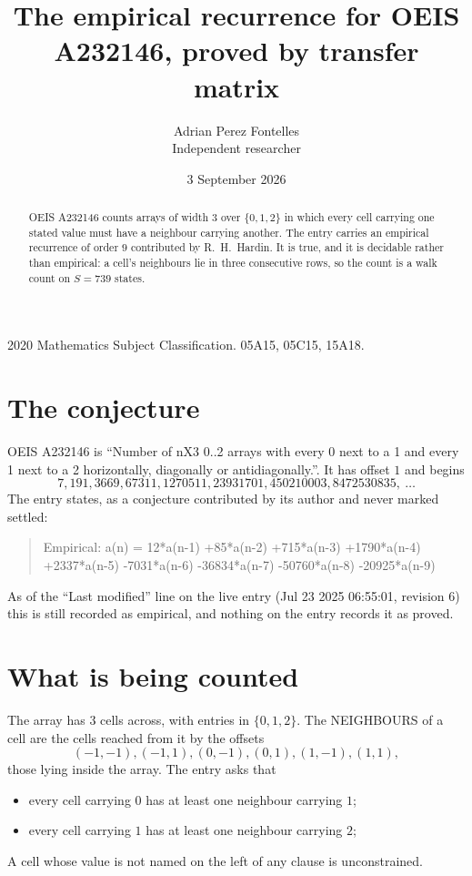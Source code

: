 \documentclass[11pt,a4paper]{article}
\title{The empirical recurrence for OEIS A232146, proved by transfer matrix}
\author{Adrian Perez Fontelles\\ \small Independent researcher}
\date{3 September 2026}
\theoremstyle{plain}
\theoremstyle{definition}
\begin{document}
\maketitle

\begin{abstract}
OEIS A232146 counts arrays of width $3$ over $\{0,1,2\}$ in which every cell carrying one stated
value must have a neighbour carrying another. The entry carries an empirical recurrence of
order $9$ contributed by R.~H.~Hardin. It is true, and it is decidable rather than
empirical: a cell's neighbours lie in three consecutive rows, so the count is a walk count on
$S=739$ states.
\end{abstract}

\noindent\small 2020 Mathematics Subject Classification. 05A15, 05C15, 15A18.\normalsize

\section{The conjecture}

OEIS A232146 is ``Number of nX3 0..2 arrays with every 0 next to a 1 and every 1 next to a 2 horizontally, diagonally or antidiagonally.''. It has offset $1$ and begins
\[
7, 191, 3669, 67311, 1270511, 23931701, 450210003, 8472530835,\ \dots
\]
The entry states, as a conjecture contributed by its author and never marked settled:
\begin{quote}
Empirical: a(n) = 12*a(n-1) +85*a(n-2) +715*a(n-3) +1790*a(n-4) +2337*a(n-5) -7031*a(n-6) -36834*a(n-7) -50760*a(n-8) -20925*a(n-9)
\end{quote}
As of the ``Last modified'' line on the live entry (Jul 23 2025 06:55:01, revision 6) this is still
recorded as empirical, and nothing on the entry records it as proved.

\section{What is being counted}

The array has $3$ cells across, with entries in $\{0,1,2\}$. The NEIGHBOURS of a cell are the
cells reached from it by the offsets
\[
(-1,-1), (-1,1), (0,-1), (0,1), (1,-1), (1,1),
\]
those lying inside the array. The entry asks that
\begin{itemize}
\item every cell carrying $0$ has at least one neighbour carrying $1$;
\item every cell carrying $1$ has at least one neighbour carrying $2$;

\end{itemize}
A cell whose value is not named on the left of any clause is unconstrained.
\end{document}
